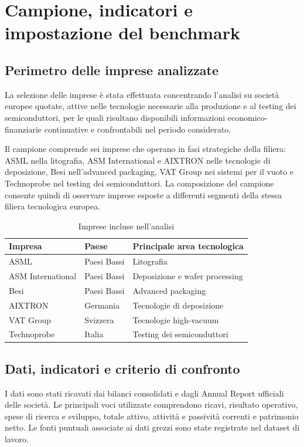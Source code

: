 \documentclass[11pt,a4paper]{article}
\begin{document}
\section{Campione, indicatori e impostazione del benchmark}

\subsection{Perimetro delle imprese analizzate}

La selezione delle imprese è stata effettuata concentrando l'analisi su società europee quotate, attive nelle tecnologie necessarie alla produzione e al testing dei semiconduttori, per le quali risultano disponibili informazioni economico-finanziarie continuative e confrontabili nel periodo considerato.

Il campione comprende sei imprese che operano in fasi strategiche della filiera: ASML nella litografia, ASM International e AIXTRON nelle tecnologie di deposizione, Besi nell'advanced packaging, VAT Group nei sistemi per il vuoto e Technoprobe nel testing dei semiconduttori. La composizione del campione consente quindi di osservare imprese esposte a differenti segmenti della stessa filiera tecnologica europea.

\begin{table}[H]
\centering
\caption{Imprese incluse nell'analisi}
\small
\begin{tabular}{lll}
\toprule
\textbf{Impresa} & \textbf{Paese} & \textbf{Principale area tecnologica} \\
\midrule
ASML & Paesi Bassi & Litografia \\
ASM International & Paesi Bassi & Deposizione e wafer processing \\
Besi & Paesi Bassi & Advanced packaging \\
AIXTRON & Germania & Tecnologie di deposizione \\
VAT Group & Svizzera & Tecnologie high-vacuum \\
Technoprobe & Italia & Testing dei semiconduttori \\
\bottomrule
\end{tabular}
\end{table}

\subsection{Dati, indicatori e criterio di confronto}

I dati sono stati ricavati dai bilanci consolidati e dagli Annual Report ufficiali delle società. Le principali voci utilizzate comprendono ricavi, risultato operativo, spese di ricerca e sviluppo, totale attivo, attività e passività correnti e patrimonio netto. Le fonti puntuali associate ai dati grezzi sono state registrate nel dataset di lavoro.
\end{document}
